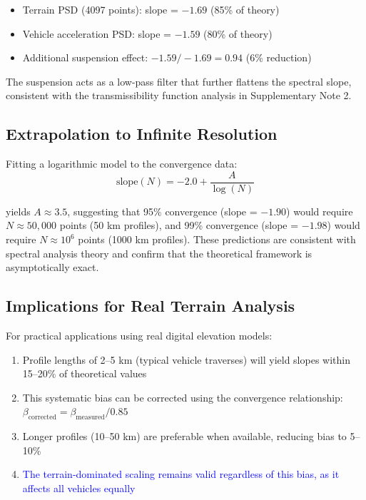 \documentclass[11pt]{article}
\begin{document}
\begin{itemize}
\item Terrain PSD (4097 points): slope = $-1.69$ (85\% of theory)
\item Vehicle acceleration PSD: slope = $-1.59$ (80\% of theory)
\item Additional suspension effect: $-1.59 / -1.69 = 0.94$ (6\% reduction)
\end{itemize}

The suspension acts as a low-pass filter that further flattens the spectral slope, consistent with the transmissibility function analysis in Supplementary Note 2.

\subsection{Extrapolation to Infinite Resolution}

Fitting a logarithmic model to the convergence data:
\begin{equation}
\text{slope}(N) = -2.0 + \frac{A}{\log(N)}
\end{equation}

yields $A \approx 3.5$, suggesting that 95\% convergence (slope = $-1.90$) would require $N \approx 50{,}000$ points (50 km profiles), and 99\% convergence (slope = $-1.98$) would require $N \approx 10^6$ points (1000 km profiles). These predictions are consistent with spectral analysis theory and confirm that the theoretical framework is asymptotically exact.

\subsection{Implications for Real Terrain Analysis}

For practical applications using real digital elevation models:
\begin{enumerate}
\item Profile lengths of 2--5 km (typical vehicle traverses) will yield slopes within 15--20\% of theoretical values

\item This systematic bias can be corrected using the convergence relationship: $\beta_{\text{corrected}} = \beta_{\text{measured}} / 0.85$

\item Longer profiles (10--50 km) are preferable when available, reducing bias to 5--10\%

\item \textcolor{blue}{The terrain-dominated scaling remains valid regardless of this bias, as it affects all vehicles equally}
\end{enumerate}
\end{document}
